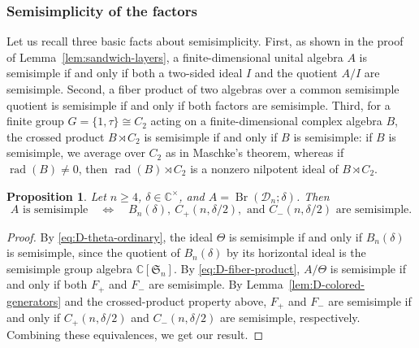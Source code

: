 \documentclass[11pt,a4paper]{amsart}
\newcommand{\Br}{\operatorname{Br}}\newcommand{\Irr}{\operatorname{Irr}}
\newtheorem{proposition}[theorem]{Proposition}
\theoremstyle{uprightdefinition}
\theoremstyle{remark}\newtheorem{remark}[theorem]{Remark}
\begin{document}
\subsubsection{Semisimplicity of the factors}

Let us recall three basic facts about semisimplicity. First, as shown in the proof of Lemma~\ref{lem:sandwich-layers}, a finite-dimensional unital algebra $A$ is semisimple if and only if both a two-sided ideal $I$ and the quotient $A/I$ are semisimple. Second, a fiber
product of two algebras over a common semisimple quotient is semisimple if and only if
both factors are semisimple. Third, for a finite group $G=\{1,\tau\}\cong C_2$ acting on a finite-dimensional complex algebra $B$, the crossed product $B\rtimes C_2$
is semisimple if and only if $B$ is semisimple: if $B$ is semisimple, we average over $C_2$ as in Maschke's theorem, whereas if $\operatorname{rad}(B)\ne0$, then $\operatorname{rad}(B)\rtimes C_2$
is a nonzero nilpotent ideal of $B\rtimes C_2$.

\begin{proposition}\label{prop:D-three-factors}
Let $n\ge4$, $\delta\in\mathbb C^\times$, and
$A=\Br(\mathscr{D}_n;\delta)$. Then
\begin{equation}\label{eq:D-three-factors}
 A\text{ is semisimple}\quad\Longleftrightarrow\quad
 B_n(\delta),\ C_+(n,\delta/2),\text{ and }C_-(n,\delta/2)
 \text{ are semisimple}.
\end{equation}
\end{proposition}
\begin{proof}
By \eqref{eq:D-theta-ordinary}, the ideal $\Theta$ is semisimple if and
only if $B_n(\delta)$ is semisimple, since the quotient of $B_n(\delta)$
by its horizontal ideal is the semisimple group algebra
$\mathbb C[\mathfrak S_n]$. By \eqref{eq:D-fiber-product}, $A/\Theta$
is semisimple if and only if both $F_+$ and $F_-$ are semisimple.
By Lemma~\ref{lem:D-colored-generators} and the crossed-product property above, $F_+$ and $F_-$ are semisimple if and only if $C_+(n,\delta/2)$ and
$C_-(n,\delta/2)$ are semisimple, respectively. Combining these equivalences, we get our result.
\end{proof}
\end{document}
